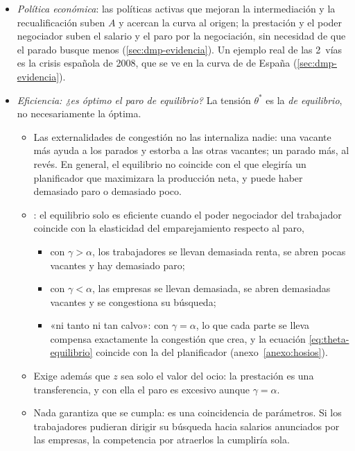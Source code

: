 \documentclass[11pt]{article}
\begin{document}
\begin{itemize}
\item \emph{Política económica}: las políticas activas que mejoran la intermediación y la recualificación suben $A$ y acercan la curva al origen; la prestación y el poder negociador suben el salario y el paro por la negociación, sin necesidad de que el parado busque menos (\ref{sec:dmp-evidencia}). Un ejemplo real de las 2~vías es la crisis española de 2008, que se ve en la curva de  de España (\ref{sec:dmp-evidencia}).
\item \emph{Eficiencia: ¿es óptimo el paro de equilibrio?} La tensión $\theta^*$ es la \emph{de equilibrio}, no necesariamente la óptima.
  \begin{itemize}
  \item Las externalidades de congestión no las internaliza nadie: una vacante más ayuda a los parados y estorba a las otras vacantes; un parado más, al revés. En general, el equilibrio no coincide con el que elegiría un planificador que maximizara la producción neta, y puede haber demasiado paro o demasiado poco.
  \item {}\nocite{Hosios1990Efficiency}: el equilibrio solo es eficiente cuando el poder negociador del trabajador coincide con la elasticidad del emparejamiento respecto al paro,
    \funcionclave[eq:hosios]{\gamma=\alpha}
    \begin{itemize}
    \item con $\gamma>\alpha$, los trabajadores se llevan demasiada renta, se abren pocas vacantes y hay demasiado paro;
    \item con $\gamma<\alpha$, las empresas se llevan demasiada, se abren demasiadas vacantes y se congestiona su búsqueda;
    \item «ni tanto ni tan calvo»: con $\gamma=\alpha$, lo que cada parte se lleva compensa exactamente la congestión que crea, y la ecuación \eqref{eq:theta-equilibrio} coincide con la del planificador (anexo~\ref{anexo:hosios}).
    \end{itemize}
  \item Exige además que $z$ sea solo el valor del ocio: la prestación es una transferencia, y con ella el paro es excesivo aunque $\gamma=\alpha$\nocite{Cahuc2014Labor}.
  \item Nada garantiza que se cumpla: es una coincidencia de parámetros. Si los trabajadores pudieran dirigir su búsqueda hacia salarios anunciados por las empresas, la competencia por atraerlos la cumpliría sola\nocite{Moen1997Competitive}.
  \end{itemize}
\end{itemize}
\end{document}

